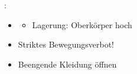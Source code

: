 
\label{m:lungenembolie}

:

\begin{itemize}
  \item {\TxMassVitMKBes}
  \begin{itemize}
    \item Lagerung: Oberkörper hoch
  \end{itemize}
  \item Striktes Bewegungsverbot!
  \item Beengende Kleidung öffnen
\end{itemize}